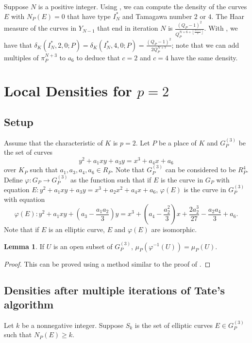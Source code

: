\documentclass[12pt,letterpaper]{amsart}
\theoremstyle{definition}
\newtheorem{lemma}[theorem]{Lemma}
\begin{document}
Suppose $N$ is a positive integer. Using , we can compute the density of the curves $E$ with $N_P(E)=0$ that have type $I_N^*$ and Tamagawa number $2$ or $4$. The Haar measure of the curves in $Y_{N-1}$ that end in iteration $N$ is $\frac{(Q_P-1)^2}{Q_P^{N+6+\left\lfloor\frac{N+5}{2}\right\rfloor}}$. With , we have that $\delta_K(I_N^*, 2, 0; P)=\delta_K(I_N^*, 4, 0; P)=\frac{(Q_P-1)^2}{2Q_P^{N+7}}$; note that we can add multiples of $\pi_P^{N+3}$ to $a_6$ to deduce that $c=2$ and $c=4$ have the same density.

\section{Local Densities for \texorpdfstring{$p=2$}{}}
\label{sec:localc}

\subsection{Setup}

Assume that the characteristic of $K$ is $p=2$. Let $P$ be a place of $K$ and $G_P^{(3)}$ be the set of curves
\[
y^2+a_1xy+a_3y=x^3+a_4x+a_6
\]
over $K_P$ such that $a_1,a_3,a_4,a_6\in R_P$. Note that $G_P^{(3)}$ can be considered to be $R_P^4$. Define $\varphi: G_P\rightarrow G_P^{(3)}$ as the function such that if $E$ is the curve in $G_P$ with equation $E: y^2+a_1xy+a_3y=x^3+a_2x^2+a_4x+a_6$, $\varphi(E)$ is the curve in $G_P^{(3)}$ with equation
\[
\varphi(E):y^2+a_1xy+\left(a_3-\frac{a_1a_2}{3}\right)y=x^3+\left(a_4-\frac{a_2^2}{3}\right)x+\frac{2a_2^3}{27}-\frac{a_2a_4}{3}+a_6.
\]
Note that if $E$ is an elliptic curve, $E$ and $\varphi(E)$ are isomorphic.

\begin{lemma}
\label{invdensity3} 
If $U$ is an open subset of $G_P^{(3)}$, $\mu_P(\varphi^{-1}(U))=\mu_P(U)$.
\end{lemma}

\begin{proof}
This can be proved using a method similar to the proof of .
\end{proof}

\subsection{Densities after multiple iterations of Tate's algorithm}

Let $k$ be a nonnegative integer. Suppose $S_k$ is the set of elliptic curves $E\in G_P^{(3)}$ such that $N_P(E)\geq k$.
\end{document}
